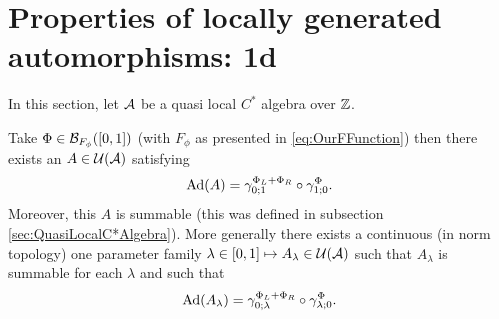 \documentclass[12pt,a4paper,twoside]{article}
\numberwithin{equation}{section}
\begin{document}
\section{Properties of locally generated automorphisms: 1d}
In this section, let $\AA$ be a quasi local $C^*$ algebra over $\ZZ$.
\begin{lemma}\label{lem:PropertiesLocallyGeneratedAutomorphisms1d}
	Take $\Phi\in\BB_{F_\phi}([0,1])$ (with $F_\phi$ as presented in \eqref{eq:OurFFunction}) then there exists an $A\in\UU(\AA)$ satisfying
	\begin{equation}
		\Ad{A}=\gamma^{\Phi_L+\Phi_R}_{0;1}\circ\gamma^\Phi_{1;0}.
	\end{equation}
	Moreover, this $A$ is summable (this was defined in subsection \ref{sec:QuasiLocalC*Algebra}). More generally there exists a continuous (in norm topology) one parameter family $\lambda\in[0,1]\mapsto A_\lambda\in\UU(\AA)$ such that $A_\lambda$ is summable for each $\lambda$ and such that
	\begin{equation}
		\Ad{A_\lambda}=\gamma^{\Phi_L+\Phi_R}_{0;\lambda}\circ\gamma^\Phi_{\lambda;0}.
	\end{equation}
\end{lemma}
\end{document}
